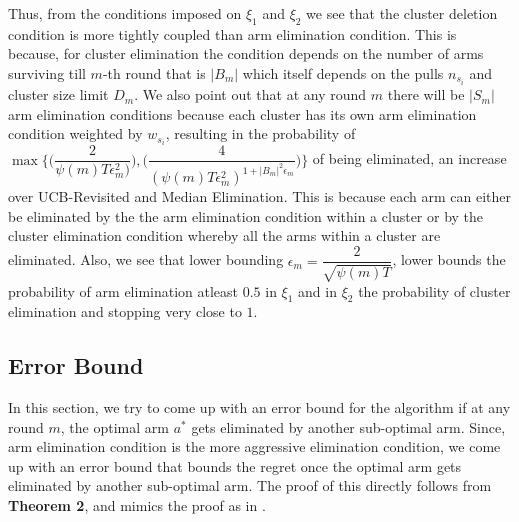 \begin{remark}
	Thus, from the conditions imposed on $\xi_{1}$ and $\xi_{2}$ we see that the cluster deletion condition is more tightly coupled than arm elimination condition. This is because, for cluster elimination the condition depends on the number of arms surviving till $m$-th round that is $|B_{m}|$ which itself depends on the pulls $n_{s_{i}}$ and cluster size limit $D_{m}$. We also point out that at any round $m$ there will be $|S_{m}|$ arm elimination conditions because each cluster has its own arm elimination condition weighted by $w_{s_{i}}$, resulting in the probability of $\max{\bigg\lbrace \bigg(\dfrac{2}{\psi(m)T\epsilon_{m}^{2})}\bigg) ,\bigg(\dfrac{4}{(\psi(m)T\epsilon_{m}^{2})^{1+|B_{m}|^{2}\epsilon_{m}}}\bigg)\bigg\rbrace}$ of being eliminated, an increase over UCB-Revisited and Median Elimination. This is because each arm can either be eliminated by the the arm elimination condition within a cluster or by the cluster elimination condition whereby all the arms within a cluster are eliminated. Also, we 
see that lower bounding $\epsilon_{m}=\dfrac{2}{\sqrt{\psi(m)T}}$, lower bounds the probability of arm elimination atleast $0.5$ in $\xi_{1}$ and in $\xi_{2}$ the probability of cluster elimination and stopping very close to $1$.
\end{remark}



\subsection{Error Bound}
	
	In this section, we try to come up with an error bound for the algorithm if at any round $m$, the optimal arm $a^{*}$ gets eliminated by another sub-optimal arm. Since, arm elimination condition is the more aggressive elimination condition, we come up with an error bound that bounds the regret once the  optimal arm gets eliminated by another sub-optimal arm. The proof of this directly follows from \textbf{Theorem 2}, and mimics the proof as in \cite{auer2010ucb}.
	
